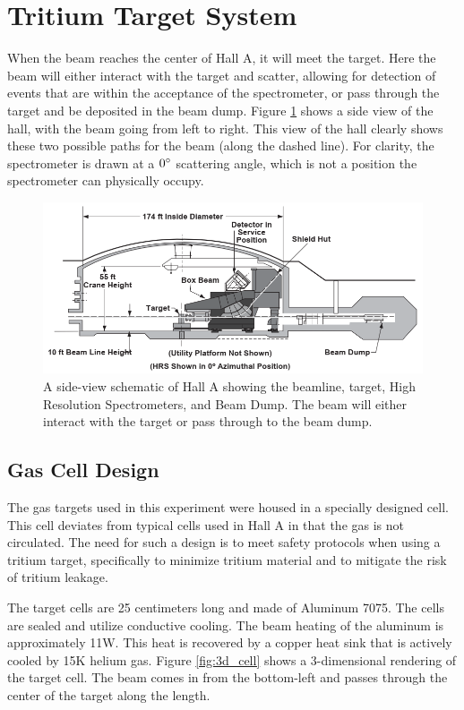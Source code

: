 \section{Tritium Target System}

When the beam reaches the center of Hall A, it will meet the target. Here the beam will either interact with the target and scatter, allowing for detection of events that are within the acceptance of the spectrometer, or pass through the target and be deposited in the beam dump. Figure \ref{fig:ha_side} shows a side view of the hall, with the beam going from left to right. This view of the hall clearly shows these two possible paths for the beam (along the dashed line). For clarity, the spectrometer is drawn at a $0\degree$ scattering angle, which is not a position the spectrometer can physically occupy.

\begin{figure}
\begin{center}
	\includegraphics[width=.8\textwidth]{./setup/fig/HallA_side.png}
	\caption{A side-view schematic of Hall A showing the beamline, target, High Resolution Spectrometers, and Beam Dump. The beam will either interact with the target or pass through to the beam dump.\cite{HANIM}}
	\label{fig:ha_side}
\end{center}
\end{figure}

\subsection{Gas Cell Design}
\label{sec:gas_cell}
The gas targets used in this experiment were housed in a specially designed cell. This cell deviates from typical cells used in Hall A in that the gas is not circulated. The need for such a design is to meet safety protocols when using a tritium target, specifically to minimize tritium material and to mitigate the risk of tritium leakage.

The target cells are 25 centimeters long and made of Aluminum 7075. The cells are sealed and utilize conductive cooling. The beam heating of the aluminum is approximately 11W. This heat is recovered by a copper heat sink that is actively cooled by 15K helium gas.\cite{cell_design} Figure \ref{fig:3d_cell} shows a 3-dimensional rendering of the target cell. The beam comes in from the bottom-left and passes through the center of the target along the length.


